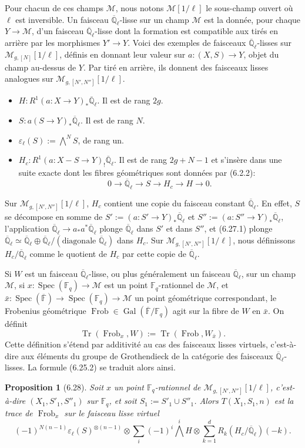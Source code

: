 \documentclass[10pt]{article}
\newcommand{\Fq}{\mathbb F_q}
\newcommand{\Fb}{\mathbb F}
\newcommand{\Ql}{\overline{\mathbb Q}_{\ell}}
\newcommand{\Gal}{\operatorname{Gal}}
\newcommand{\Spec}{\operatorname{Spec}}
\newcommand{\Frob}{\operatorname{Frob}}
\newcommand{\Tr}{\operatorname{Tr}}
\theoremstyle{deligne}
\newtheorem*{proposition*}{Proposition}
\begin{document}
Pour chacun de ces champs $\mathcal M$, nous notons $\mathcal M[1/\ell]$ le sous-champ ouvert où $\ell$ est inversible. Un faisceau $\Ql$-lisse sur un champ $\mathcal M$ est la donnée, pour chaque $Y\to\mathcal M$, d'un faisceau $\Ql$-lisse dont la formation est compatible aux tirés en arrière par les morphismes $Y'\to Y$. Voici des exemples de faisceaux $\Ql$-lisses sur $\mathcal M_{g,[N]}[1/\ell]$, définis en donnant leur valeur sur $a:(X,S)\to Y$, objet du champ au-dessus de $Y$. Par tiré en arrière, ils donnent des faisceaux lisses analogues sur $\mathcal M_{g,[N',N'']}[1/\ell]$.
\begin{itemize}
\item $H:R^1(a:X\to Y)_*\Ql$. Il est de rang $2g$.
\item $S:a(S\to Y)_*\Ql$. Il est de rang $N$.
\item $\varepsilon_\ell(S):=\bigwedge^N S$, de rang un.
\item $H_c:R^1(a:X-S\to Y)_!\Ql$. Il est de rang $2g+N-1$ et s'insère dans une suite exacte dont les fibres géométriques sont données par (6.2.2):
\begin{equation}\tag{6.27.1}
0\longrightarrow\Ql\longrightarrow S\longrightarrow H_c\longrightarrow H\longrightarrow0.
\end{equation}
\end{itemize}
Sur $\mathcal M_{g,[N',N'']}[1/\ell]$, $H_c$ contient une copie du faisceau constant $\Ql$. En effet, $S$ se décompose en somme de $S':=(a:S'\to Y)_*\Ql$ et $S'':=(a:S''\to Y)_*\Ql$, l'application $\Ql\to a_*a^*\Ql$ plonge $\Ql$ dans $S'$ et dans $S''$, et (6.27.1) plonge $\Ql\simeq\Ql\oplus\Ql/(\text{diagonale }\Ql)$ dans $H_c$. Sur $\mathcal M_{g,[N',N'']}[1/\ell]$, nous définissons $H_c/\Ql$ comme le quotient de $H_c$ par cette copie de $\Ql$.

Si $W$ est un faisceau $\Ql$-lisse, ou plus généralement un faisceau $\Ql$, sur un champ $\mathcal M$, si $x:\Spec(\Fq)\to\mathcal M$ est un point $\Fq$-rationnel de $\mathcal M$, et $\bar x:\Spec(\overline{\Fb})\to\Spec(\Fq)\to\mathcal M$ un point géométrique correspondant, le Frobenius géométrique $\Frob\in\Gal(\overline{\Fb}/\Fq)$ agit sur la fibre de $W$ en $\bar x$. On définit
\[
\Tr(\Frob_x,W):=\Tr(\Frob,W_{\bar x}).
\]
Cette définition s'étend par additivité au cas des faisceaux lisses virtuels, c'est-à-dire aux éléments du groupe de Grothendieck de la catégorie des faisceaux $\Ql$-lisses. La formule (6.25.2) se traduit alors ainsi.

\begin{proposition*}[6.28]
Soit $x$ un point $\Fq$-rationnel de $\mathcal M_{g,[N',N'']}[1/\ell]$, c'est-à-dire $(X_1,S'_1,S''_1)$ sur $\Fq$, et soit $S_1:=S'_1\cup S''_1$. Alors $T(X_1,S_1,n)$ est la trace de $\Frob_x$ sur le faisceau lisse virtuel
\begin{equation}\tag{6.28.1}
(-1)^{N(n-1)}\varepsilon_\ell(S)^{\otimes(n-1)}\otimes
\sum_i(-1)^i\bigwedge^iH\otimes
\sum_{k=1}^d R_k(H_c/\Ql)(-k).
\end{equation}
\end{proposition*}
\end{document}
